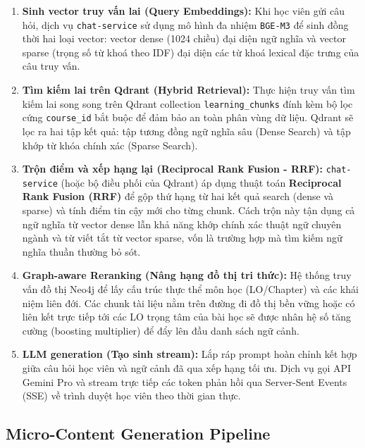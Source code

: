 \begin{enumerate}
    \item \textbf{Sinh vector truy vấn lai (Query Embeddings):} Khi học viên
          gửi câu hỏi, dịch vụ \texttt{chat-service} sử dụng mô hình đa
          nhiệm \texttt{BGE-M3} để sinh đồng thời hai loại vector: vector
          dense (1024 chiều) đại diện ngữ nghĩa và vector sparse (trọng số
          từ khoá theo IDF) đại diện các từ khoá lexical đặc trưng của
          câu truy vấn.
    \item \textbf{Tìm kiếm lai trên Qdrant (Hybrid Retrieval):} Thực hiện
          truy vấn tìm kiếm lai song song trên Qdrant collection
          \texttt{learning\_chunks} đính kèm bộ lọc cứng \texttt{course\_id}
          bắt buộc để đảm bảo an toàn phân vùng dữ liệu. Qdrant sẽ lọc ra
          hai tập kết quả: tập tương đồng ngữ nghĩa sâu (Dense Search) và
          tập khớp từ khóa chính xác (Sparse Search).
    \item \textbf{Trộn điểm và xếp hạng lại (Reciprocal Rank Fusion - RRF):}
          \texttt{chat-service} (hoặc bộ điều phối của Qdrant) áp dụng thuật
          toán \textbf{Reciprocal Rank Fusion (RRF)} để gộp thứ hạng từ
          hai kết quả search (dense và sparse) và tính điểm tin cậy mới
          cho từng chunk. Cách trộn này tận dụng cả ngữ nghĩa từ vector
          dense lẫn khả năng khớp chính xác thuật ngữ chuyên ngành và
          từ viết tắt từ vector sparse, vốn là trường hợp mà tìm kiếm
          ngữ nghĩa thuần thường bỏ sót.
    \item \textbf{Graph-aware Reranking (Nâng hạng đồ thị tri thức):} Hệ
          thống truy vấn đồ thị Neo4j để lấy cấu trúc thực thể môn học
          (LO/Chapter) và các khái niệm liên đới. Các chunk tài liệu nằm
          trên đường đi đồ thị bền vững hoặc có liên kết trực tiếp tới các
          LO trọng tâm của bài học sẽ được nhân hệ số tăng cường (boosting
          multiplier) để đẩy lên đầu danh sách ngữ cảnh.
    \item \textbf{LLM generation (Tạo sinh stream):} Lắp ráp prompt hoàn
          chỉnh kết hợp giữa câu hỏi học viên và ngữ cảnh đã qua xếp hạng
          tối ưu. Dịch vụ gọi API Gemini Pro và stream trực tiếp các token
          phản hồi qua Server-Sent Events (SSE) về trình duyệt học viên
          theo thời gian thực.
\end{enumerate}

\subsection{Micro-Content Generation Pipeline}

